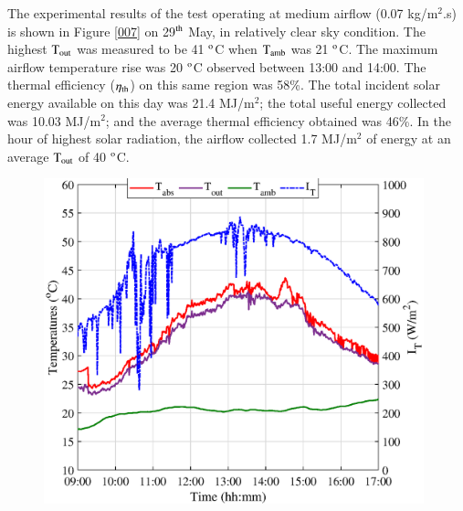 The experimental results of the test operating at medium airflow (0.07 kg/m$^2$.s) is shown in Figure \ref{007} on 29$^{\rm{th}}$ May, in relatively clear sky condition. The highest $\rm{T_{out}}$ was measured to be 41 $^{\rm{o}}$C  when $\rm{T_{amb}}$ was 21 $^{\rm{o}}$C. The maximum airflow temperature rise was 20 $^{\rm{o}}$C observed between 13:00 and 14:00. The thermal efficiency ($\eta_{\rm{th}}$) on this same region was 58\%. The total incident solar energy available on this day was 21.4 MJ/m$^2$; the total useful energy collected was 10.03 MJ/m$^2$; and the average thermal efficiency obtained was 46\%. In the hour of highest solar radiation, the airflow collected 1.7 MJ/m$^2$ of energy at an average $\rm{T_{out}}$ of 40 $^{\rm{o}}$C.


\begin{figure}[!ht]
	\centering
	\begin{minipage}{0.49\textwidth}
		\centering
		\includegraphics[width=0.98\textwidth]{figs/007-1.eps} %
	\end{minipage}\hfill
	\begin{minipage}{0.49\textwidth}
		\centering

\end{minipage}
\end{figure}
